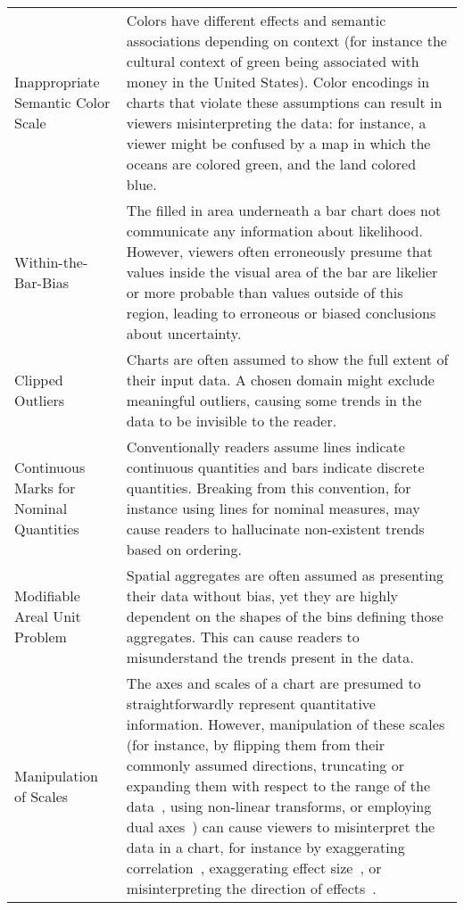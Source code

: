 \begin{longtable}{>{\raggedright\arraybackslash}p{3cm}p{14cm}}
 \rowcolor{colorc}Inappropriate Semantic Color Scale  & Colors have different effects and semantic associations depending on context (for instance the cultural context of green being associated with money in the United States). Color encodings in charts that violate these assumptions can result in viewers misinterpreting the data: for instance, a viewer might be confused by a map in which the oceans are colored green, and the land colored blue. \cite{lin2013selecting}\\
 \rowcolor{colorc-opaque}Within-the-Bar-Bias  & The filled in area underneath a bar chart does not communicate any information about likelihood. However, viewers often erroneously presume that values inside the visual area of the bar are likelier or more probable than values outside of this region, leading to erroneous or biased conclusions about uncertainty. \cite{correll2014error,newman2012bar}\\
 \rowcolor{colorc}Clipped Outliers  & Charts are often assumed to show the full extent of their input data. A chosen domain might exclude meaningful outliers, causing some trends in the data to be invisible to the reader. \\
 \rowcolor{colorc-opaque}Continuous Marks for Nominal Quantities  & Conventionally readers assume lines indicate continuous quantities and bars indicate discrete quantities. Breaking from this convention, for instance using lines for nominal measures, may cause readers to hallucinate non-existent trends based on ordering.  \cite{mcnuttlinting, zacks1999bars}\\
 \rowcolor{colorc}Modifiable Areal Unit Problem  & Spatial aggregates are often assumed as presenting their data without bias, yet they are highly dependent on the shapes of the bins defining those aggregates. This can cause readers to misunderstand the trends present in the data. \cite{fotheringham1991modifiable, kindlmann2014algebraic}\\
 \rowcolor{colorc-opaque}Manipulation of  Scales  & The axes and scales of a chart are presumed to straightforwardly represent quantitative information. However, manipulation of these scales (for instance, by flipping them from their commonly assumed directions, truncating or expanding them with respect to the range of the data~\cite{pandey2015deceptive, correll2017black, cleveland1982variables, ritchie2019lie, correll2019truncating}, using non-linear transforms, or employing dual axes~\cite{KindlmannAlgebraicVisPedagogyPDV2016, cairo2015graphics}) can cause viewers to misinterpret the data in a chart, for instance by exaggerating correlation~\cite{cleveland1982variables}, exaggerating effect size~\cite{correll2019truncating,pandey2015deceptive}, or misinterpreting the direction of effects~\cite{pandey2015deceptive}. \cite{cairo2015graphics,correll2017black,correll2019truncating,cleveland1982variables,KindlmannAlgebraicVisPedagogyPDV2016,pandey2015deceptive,ritchie2019lie}\\

\end{longtable}
